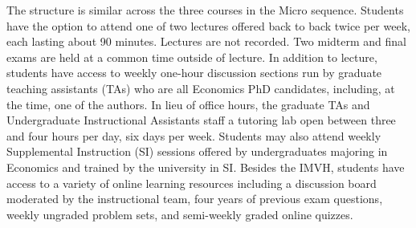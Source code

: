 \documentclass[12pt]{article}
\begin{document}
The structure is similar across the three courses in the Micro sequence. Students have the option to attend one of two lectures offered back to back twice per week, each lasting about 90 minutes. Lectures are not recorded. Two midterm and final exams are held at a common time outside of lecture. In addition to lecture, students have access to weekly one-hour discussion sections run by graduate teaching assistants (TAs) who are all Economics PhD candidates, including, at the time, one of the authors. In lieu of office hours, the graduate TAs and Undergraduate Instructional Assistants staff a tutoring lab open between three and four hours per day, six days per week. Students may also attend weekly Supplemental Instruction (SI) sessions offered by undergraduates majoring in Economics and trained by the university in SI. Besides the IMVH, students have access to a variety of online learning resources including a discussion board moderated by the instructional team, four years of previous exam questions, weekly ungraded problem sets, and semi-weekly graded online quizzes.


\end{document}
